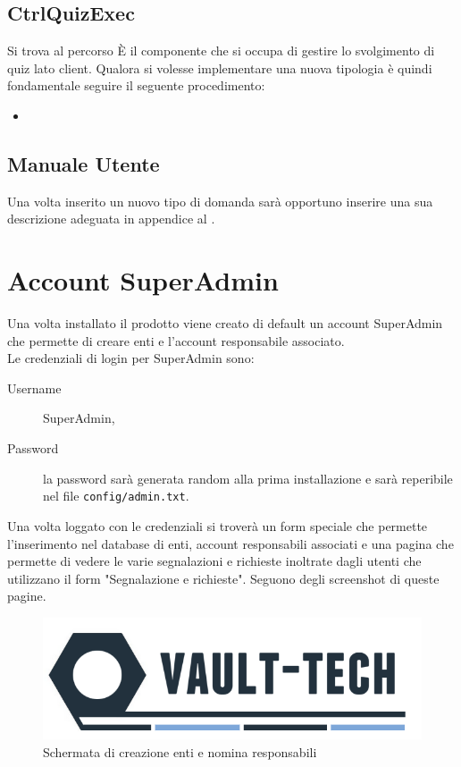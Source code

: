 \documentclass[a4paper, titlepage]{article}
\begin{document}
	\subsection{CtrlQuizExec}
	Si trova al percorso 
	È il componente che si occupa di gestire lo svolgimento di quiz lato client.
	Qualora si volesse implementare una nuova tipologia è quindi fondamentale seguire il seguente procedimento:
	\begin{itemize}
		\item 
	\end{itemize}
	
	
	\subsection{Manuale Utente}
	Una volta inserito un nuovo tipo di domanda sarà opportuno inserire una sua descrizione adeguata in appendice al .
	
	\newpage
	\section{Account SuperAdmin}
	Una volta installato il prodotto viene creato di default un account SuperAdmin che permette di creare enti e l'account responsabile associato. 
	\\ Le credenziali di login per SuperAdmin sono:
	\begin{description}
		\item[Username] SuperAdmin,
		\item[Password] la password sarà generata random alla prima installazione e sarà reperibile nel file \texttt{config/admin.txt}.
	\end{description}
	Una volta loggato con le credenziali si troverà un form speciale che permette l'inserimento nel database di enti, account responsabili associati e una pagina che permette di vedere le varie segnalazioni e richieste inoltrate dagli utenti che utilizzano il form "Segnalazione e richieste". Seguono degli screenshot di queste pagine.
	
	\begin{figure}[!h]
		\centering
		\includegraphics[scale=0.5]{Img/logo.png}
		\caption{Schermata di creazione enti e nomina responsabili}
	\end{figure}
	
\end{document}
